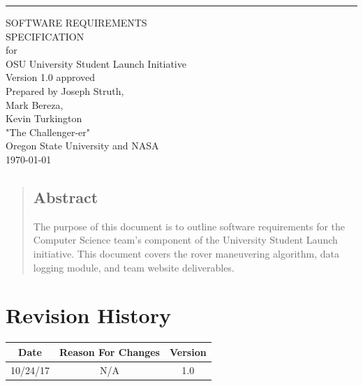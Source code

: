\documentclass{scrreprt}
\date{}
\def\myversion{1.0 }
\begin{document}
\begin{titlepage}
\begin{flushright}
    \rule{16cm}{5pt}\vskip1cm
    \begin{bfseries}
        \Huge{SOFTWARE REQUIREMENTS\\ SPECIFICATION}\\
        \vspace{0.8cm}
        for\\
        \vspace{0.8cm}
        OSU University Student Launch Initiative\\
        \vspace{1.8cm}
        \LARGE{Version \myversion approved}\\
        \vspace{1.8cm}
        Prepared by Joseph Struth,\\ Mark Bereza,\\ Kevin Turkington\\
        "The Challenger-er"\\
        \vspace{1.9cm}
        Oregon State University and NASA\\
        \vspace{0.5cm}
        \today\\
    \end{bfseries}
\end{flushright}

\begin{abstract}
\section{Abstract}
The purpose of this document is to outline software requirements for the Computer Science team's component of the University Student Launch initiative. This document covers the rover maneuvering algorithm, data logging module, and team website deliverables.
  
\end{abstract}    
\end{titlepage}
 
\tableofcontents


\chapter*{Revision History}

\begin{center}
    \begin{tabular}{|c|c|c|}
        \hline
	    Date & Reason For Changes & Version\\
        \hline
	    10/24/17 & N/A & 1.0\\
        \hline
    \end{tabular}
\end{center}
\end{document}
